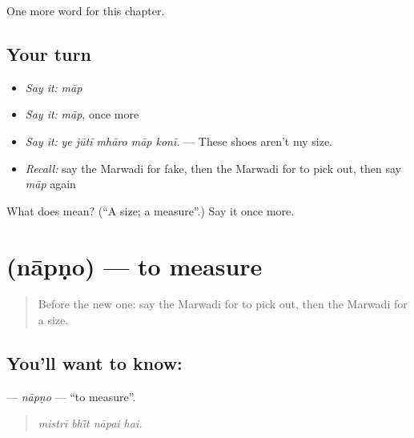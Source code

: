 \begin{grammarlens}[title={What you've built}]
One more word for this chapter.
\end{grammarlens}

\subsection*{Your turn}
\begin{itemize}
\raggedright
  \item \emph{Say it:} \emph{māp}
  \item \emph{Say it:} \emph{māp}, once more
  \item \emph{Say it:} \emph{ye jūtī mhāro māp konī.} — These shoes aren't my size.
  \item \emph{Recall:} say the Marwadi for fake, then the Marwadi for to pick out, then say \emph{māp} again
\end{itemize}

\begin{tcolorbox}[breakable,colback=teal!4,colframe=teal!35!black,title={Before you move on}]
What does  mean? (\textquotedblleft{}A size; a measure\textquotedblright{}.) Say it once more.
\end{tcolorbox}
\section[\texorpdfstring{\mw{नापणो} (nāpṇo)}{नापणो (nāpṇo)}]{ (nāpṇo) — to measure}

\label{lesson:MW-C211-napno}



\begin{quote}
Before the new one: say the Marwadi for to pick out, then the Marwadi for a size.
\end{quote}

\subsection*{You'll want to know: }
\textbf{} — \emph{nāpṇo} — \textquotedblleft{}to measure\textquotedblright{}.

\begin{quote}
   
\end{quote}

\begin{quote}
\emph{mistrī bhī̃t nāpai hai.}
\end{quote}

